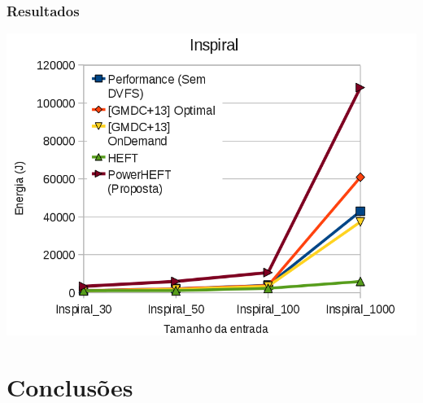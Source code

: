 \documentclass{beamer}
\begin{document}
\begin{frame}
\frametitle{Resultados}
	\begin{center}
		\includegraphics[width=0.9\columnwidth]{Inspiral.png}
	\end{center}
\end{frame}


\section{Conclusões}
\subsection{}
\end{document}

